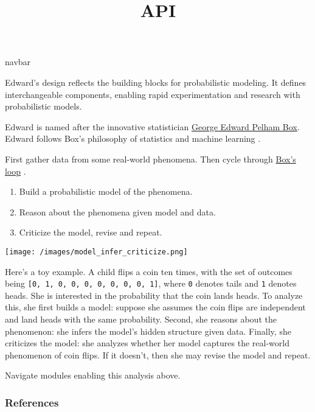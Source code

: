\title{API}

{{navbar}}

Edward's design reflects the building blocks for probabilistic
modeling. It defines interchangeable components, enabling rapid
experimentation and research with probabilistic models.

Edward is named after the innovative statistician
\href{https://en.wikipedia.org/wiki/George_E._P._Box}{George Edward
Pelham Box}. Edward follows Box's philosophy of statistics and machine
learning \citep{box1976science}.

First gather data from some real-world phenomena. Then cycle through
\href{http://www.annualreviews.org/eprint/7xbyci3nwAg5kEttvvjk/full/10.1146/annurev-statistics-022513-115657}
{Box's loop} \citep{blei2014build}.

\begin{enumerate}
\item Build a probabilistic model of the phenomena.
\item Reason about the phenomena given model and data.
\item Criticize the model, revise and repeat.
\end{enumerate}

\texttt{[image: /images/model\_infer\_criticize.png]}

Here's a toy example. A child flips a coin ten times, with the set of outcomes
being \texttt{{[}0,\ 1,\ 0,\ 0,\ 0,\ 0,\ 0,\ 0,\ 0,\ 1{]}}, where \texttt{0}
denotes tails and \texttt{1} denotes heads. She is interested in the
probability that the coin lands heads. To analyze this, she first
builds a model: suppose she assumes the coin flips are independent and
land heads with the same probability. Second, she reasons about the
phenomenon: she infers the model's hidden structure given data.
Finally, she criticizes the model: she analyzes whether her model
captures the real-world phenomenon of coin flips. If it doesn't, then
she may revise the model and repeat.

Navigate modules enabling this analysis above.

\subsubsection{References}\label{references}
